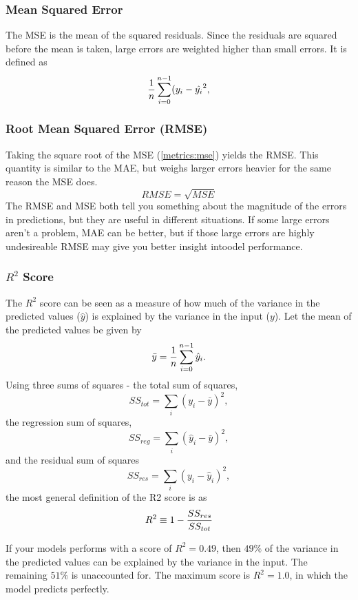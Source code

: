 \subsubsection{Mean Squared Error}
The MSE is the mean of the squared residuals. Since the residuals are squared
before the mean is taken, large errors are weighted higher than small errors.
It is defined as
\begin{equation}\label{metrics:mse}
    \frac{1}{n}\sum_{i=0}^{n-1}(y_i - \hat{y_i}^{2},
\end{equation}

\subsubsection{Root Mean Squared Error (RMSE)}
Taking the square root of the MSE (\ref{metrics:mse}) yields the RMSE.
This quantity is similar to the MAE, but weighs larger errors heavier
for the same reason the MSE does.
\begin{equation}
    RMSE = \sqrt{MSE}
\end{equation}
The RMSE and MSE both tell you something about the magnitude of the errors
in predictions, but they are useful in different situations. If some large
errors aren't a problem, MAE can be better, but if those large errors are
highly undesireable RMSE may give you better insight intoodel performance.

\subsubsection{$R^2$ Score}
The $R^2$ score can be seen as a measure of how much of the variance in the
predicted values ($\hat{y}$) is explained by the variance in the input ($y$).
Let the mean of the predicted values be given by
\begin{equation}\label{metrics:mean}
    \bar{y} =\frac{1}{n}\sum_{i=0}^{n-1}\hat{y}_{i}.
\end{equation}
Using three sums of squares - the total sum of squares,
\begin{equation}
    SS_{tot} = \sum_{i}(y_i - \bar{y})^{2},
\end{equation}
the regression sum of squares,
\begin{equation}
    SS_{reg} = \sum_{i}(\hat{y}_i - \bar{y})^{2},
\end{equation}
and the residual sum of squares
\begin{equation}
    SS_{res} = \sum_{i}(y_i - \hat{y}_i)^{2},
\end{equation}
the most general definition of the R2 score is as
\begin{equation}
    R^2 \equiv 1 - \frac{SS_{res}}{SS_{tot}}
\end{equation}

If your models performs with a score of $R^2 = 0.49$, then $49\%$ of the
variance in the predicted values can be explained by the variance in the input.
The remaining $51\%$ is unaccounted for. The maximum score is $R^2 = 1.0$,
in which the model predicts perfectly.


